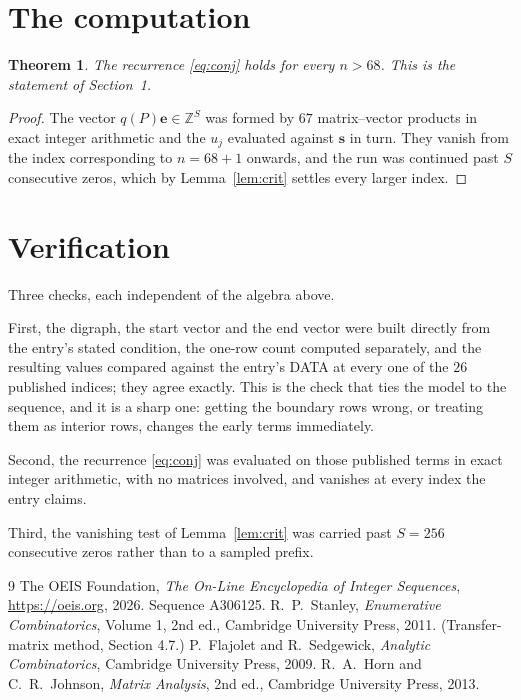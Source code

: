 \documentclass[11pt,a4paper]{article}
\theoremstyle{plain}
\newtheorem{theorem}{Theorem}
\theoremstyle{definition}
\begin{document}
\section{The computation}

\begin{theorem}
The recurrence \eqref{eq:conj} holds for every $n>68$. This is the statement of
Section~1.
\end{theorem}

\begin{proof}
The vector $q(P)\mathbf{e}\in\mathbb{Z}^{S}$ was formed by $67$ matrix--vector
products in exact integer arithmetic and the $u_j$ evaluated against $\mathbf{s}$ in turn.
They vanish from the index corresponding to $n=68+1$ onwards, and the run was continued
past $S$ consecutive zeros, which by Lemma~\ref{lem:crit} settles every larger index.
\end{proof}

\section{Verification}

Three checks, each independent of the algebra above.

First, the digraph, the start vector and the end vector were built directly from the
entry's stated condition, the one-row count computed separately, and the resulting values
compared against the entry's DATA at every one of the $26$ published indices; they
agree exactly. This is the check that ties the model to the sequence, and it is a sharp one:
getting the boundary rows wrong, or treating them as interior rows, changes the early terms
immediately.

Second, the recurrence \eqref{eq:conj} was evaluated on those published terms in exact
integer arithmetic, with no matrices involved, and vanishes at every index the entry claims.

Third, the vanishing test of Lemma~\ref{lem:crit} was carried past $S=256$ consecutive
zeros rather than to a sampled prefix.

\begin{thebibliography}{9}
 The OEIS Foundation, \emph{The On-Line Encyclopedia of Integer
Sequences}, \url{https://oeis.org}, 2026. Sequence A306125.
 R.~P.~Stanley, \emph{Enumerative Combinatorics}, Volume 1, 2nd ed.,
Cambridge University Press, 2011. (Transfer-matrix method, Section 4.7.)
 P.~Flajolet and R.~Sedgewick, \emph{Analytic Combinatorics}, Cambridge
University Press, 2009.
 R.~A.~Horn and C.~R.~Johnson, \emph{Matrix Analysis}, 2nd ed., Cambridge
University Press, 2013.
\end{thebibliography}
\end{document}
